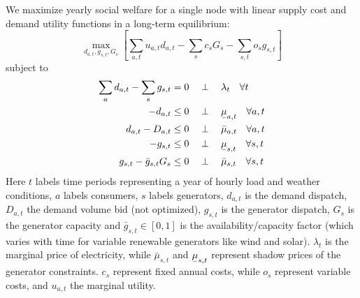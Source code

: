 \documentclass[final,3p]{elsarticle}
\def\l{\lambda} \def\K{\kappa} \def\m{\mu} \def\G{\Gamma} \def\d{\partial}
\begin{document}
We maximize yearly social welfare for a single node with linear supply cost and
demand utility functions in a long-term equilibrium:
\begin{equation}
  \max_{d_{a,t}, g_{s,t}, G_s}\left[\sum_{a,t} u_{a,t} d_{a,t} -  \sum_s c_s G_s - \sum_{s,t} o_{s} g_{s,t}\right]  \label{eq:objl}
\end{equation}
subject to
\begin{align}
  \sum_a d_{a,t} - \sum_s g_{s,t} & =  0 \hspace{0.34cm}\perp \hspace{0.34cm} \l_t \hspace{0.34cm} \forall t \label{eq:balance} \\
  -d_{a,t}                        & \leq 0 \hspace{0.34cm}\perp \hspace{0.34cm} \ubar{\mu}_{a,t} \hspace{0.34cm} \forall a,t    \\
  d_{a,t} - D_{a,t}               & \leq 0 \hspace{0.34cm}\perp \hspace{0.34cm} \bar{\mu}_{a,t} \hspace{0.34cm} \forall a,t     \\
  -g_{s,t}                        & \leq 0 \hspace{0.34cm}\perp \hspace{0.34cm} \ubar{\mu}_{s,t} \hspace{0.34cm} \forall s,t    \\
  g_{s,t} - \bar{g}_{s,t} G_s     & \leq 0 \hspace{0.34cm}\perp \hspace{0.34cm} \bar{\mu}_{s,t} \hspace{0.34cm} \forall s,t
\end{align}
Here $t$ labels time periods representing a year of hourly load and weather conditions,
$a$ labels consumers, $s$ labels generators, $d_{a,t}$ is the demand dispatch,
$D_{a,t}$ the demand volume bid (not optimized), $g_{s,t}$ is the generator
dispatch, $G_s$ is the generator capacity and $\bar{g}_{s,t}\in[0,1]$ is the
availability/capacity factor (which varies with time for variable renewable
generators like wind and solar). $\l_t$ is the marginal price of electricity,
while $\bar{\mu}_{s,t}$ and $\ubar{\mu}_{s,t}$ represent shadow prices of the
generator constraints. $c_s$ represent fixed annual costs, while $o_s$ represent
variable costs, and $u_{a,t}$ the marginal utility.
\end{document}
